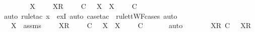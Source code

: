 \begin{isabellebody}
\ \ \isamarkupfalse%
\ \isamarkupfalse%
\ {\isachardoublequoteopen}{\isasymexists}\ {\isasymrho}{\isacharprime}{\isacharprime}\ {\isasymsigma}{\isacharprime}{\isacharprime}\ X{\isacharprime}{\isachardot}\ {\isasymsigma}\ {\isacharequal}\ {\isasymrho}{\isacharprime}{\isacharprime}\ {\isacharat}\ {\isacharbrackleft}X{\isacharprime}{\isacharbrackright}\isactrlsub R\ {\isacharhash}\ {\isasymsigma}{\isacharprime}{\isacharprime}\ {\isasymand}\ {\isasymrho}{\isacharprime}\ {\isasymsubseteq}\isactrlsub C\ {\isasymrho}{\isacharprime}{\isacharprime}\ {\isasymand}\ X\ {\isasymsubseteq}\ X{\isacharprime}\ {\isasymand}\ {\isasymsigma}{\isacharprime}\ {\isacharat}\ {\isasymtau}{\isacharprime}\ {\isasymsubseteq}\isactrlsub C\ {\isasymsigma}{\isacharprime}{\isacharprime}{\isachardoublequoteclose}\isanewline
\ \ \ \ \isamarkupfalse%
\ {\isacharparenleft}auto{\isacharcomma}\ rule{\isacharunderscore}tac\ x{\isacharequal}{\isachardoublequoteopen}{\isasymrho}{\isacharprime}{\isacharprime}{\isachardoublequoteclose}\ \ exI{\isacharcomma}\ auto{\isacharcomma}\ case{\isacharunderscore}tac\ {\isasymsigma}{\isacharprime}{\isacharprime}\ rule{\isacharcolon}ttWF{\isachardot}cases{\isacharcomma}\ auto{\isacharparenright}\isanewline
\ \ \isamarkupfalse%
\ \isamarkupfalse%
\ {\isasymrho}{\isacharprime}{\isacharprime}\ {\isasymsigma}{\isacharprime}{\isacharprime}\ X{\isacharprime}\ \ {\isasymsigma}{\isacharunderscore}assms{\isacharcolon}\ {\isachardoublequoteopen}{\isasymsigma}\ {\isacharequal}\ {\isasymrho}{\isacharprime}{\isacharprime}\ {\isacharat}\ {\isacharbrackleft}X{\isacharprime}{\isacharbrackright}\isactrlsub R\ {\isacharhash}\ {\isasymsigma}{\isacharprime}{\isacharprime}\ {\isasymand}\ {\isasymrho}{\isacharprime}\ {\isasymsubseteq}\isactrlsub C\ {\isasymrho}{\isacharprime}{\isacharprime}\ {\isasymand}\ X\ {\isasymsubseteq}\ X{\isacharprime}\ {\isasymand}\ {\isasymsigma}{\isacharprime}\ {\isacharat}\ {\isasymtau}{\isacharprime}\ {\isasymsubseteq}\isactrlsub C\ {\isasymsigma}{\isacharprime}{\isacharprime}{\isachardoublequoteclose}\isanewline
\ \ \ \ \isamarkupfalse%
\ auto\isanewline
\ \ \isamarkupfalse%
\ \isamarkupfalse%
\ {\isachardoublequoteopen}{\isasymrho}{\isacharprime}\ {\isacharat}\ {\isacharbrackleft}{\isacharbrackleft}X{\isacharbrackright}\isactrlsub R{\isacharbrackright}\ {\isasymsubseteq}\isactrlsub C\ {\isasymrho}{\isacharprime}{\isacharprime}\ {\isacharat}\ {\isacharbrackleft}{\isacharbrackleft}X{\isacharprime}{\isacharbrackright}\isactrlsub R{\isacharbrackright}{\isachardoublequoteclose}\isanewline

\end{isabellebody}
